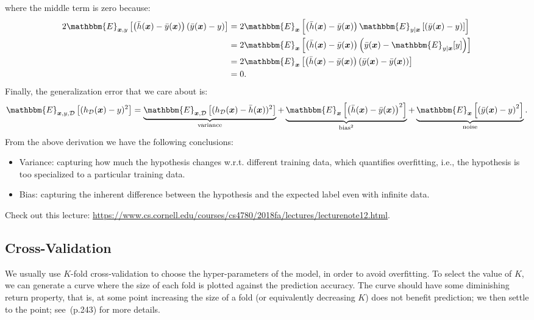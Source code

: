         where the middle term is zero because:
            \begin{equation}
                \begin{aligned}
                        2\mathbbm{E}_{\bm{x}, y }\left[ \left( \bar{h}(\bm{x}) - \bar{y}(\bm{x}) \right)\left( \bar{y}(\bm{x}) - y \right) \right]    & = 2\mathbbm{E}_{\bm{x}}\left[ \left( \bar{h}(\bm{x}) - \bar{y}(\bm{x}) \right)    \mathbbm{E}_{y|\bm{x}}\left[\left( \bar{y}(\bm{x}) - y \right) \right] \right] \\
                        & = 2\mathbbm{E}_{\bm{x}}\left[ \left( \bar{h}(\bm{x}) - \bar{y}(\bm{x}) \right) \left( \bar{y}(\bm{x}) - \mathbbm{E}_{y|\bm{x}}[y] \right) \right] \\
                        & = 2\mathbbm{E}_{\bm{x}}\left[ \left( \bar{h}(\bm{x}) - \bar{y}(\bm{x}) \right) \left( \bar{y}(\bm{x}) - \bar{y}(\bm{x}) \right) \right] \\
                        & = 0.
                \end{aligned}
            \end{equation}
        Finally, the generalization error that we care about is:
            \begin{equation}
                \mathbbm{E}_{\bm{x}, y, \mathcal{D}}\left[ (h_{\mathcal{D}}(\bm{x}) - y )^2 \right] = \underbrace{\mathbbm{E}_{\bm{x}, \mathcal{D}}\left[ (h_{\mathcal{D}}(\bm{x}) - \bar{h}(\bm{x}))^2 \right]}_{\text{variance}} + \underbrace{\mathbbm{E}_{\bm{x} }\left[ \left( \bar{h}(\bm{x}) - \bar{y}(\bm{x}) \right)^2 \right]}_{\text{bias}^2} + \underbrace{\mathbbm{E}_{\bm{x}}\left[ \left( \bar{y}(\bm{x}) - y \right)^2 \right]}_{\text{noise}}.
            \end{equation}
        From the above derivation we have the following conclusions:
            \begin{itemize}
                \item Variance: capturing how much the hypothesis changes w.r.t. different training data, which quantifies overfitting, i.e., the hypothesis is too specialized to a particular training data.
                \item Bias: capturing the inherent difference between the hypothesis and the expected label even with infinite data.
            \end{itemize}
        Check out this lecture: \url{https://www.cs.cornell.edu/courses/cs4780/2018fa/lectures/lecturenote12.html}.


\subsection{Cross-Validation}
    We usually use $K$-fold cross-validation to choose the hyper-parameters of the model, in order to avoid overfitting.
    To select the value of $K$, we can generate a curve where the size of each fold is plotted against the prediction accuracy. 
    The curve should have some diminishing return property, that is, at some point increasing the size of a fold (or equivalently decreasing $K$) does not benefit prediction; we then settle to the point; see~\cite{hastie2009elements}(p.243) for more details.



